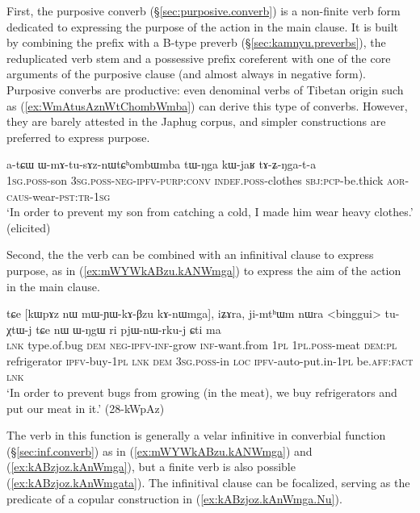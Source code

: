 First, the purposive converb (§\ref{sec:purposive.converb}) is a non-finite verb form dedicated to expressing the purpose of the action in the main clause. It is built by combining the prefix  with a B-type preverb (§\ref{sec:kamnyu.preverbs}), the reduplicated verb stem and a possessive prefix coreferent with one of the core arguments of the purposive clause (and almost always in negative form). Purposive converbs are productive: even denominal verbs of Tibetan origin such as    (\ref{ex:WmAtusAznWtChombWmba}) can derive this type of converbs. However, they are barely attested in the Japhug corpus, and simpler constructions are preferred to express purpose.


\begin{exe}
\ex \label{ex:WmAtusAznWtChombWmba}
\gll  a-tɕɯ ɯ-mɤ-tu-sɤz-nɯtɕʰombɯ\redp{}mba tɯ-ŋga kɯ-jaʁ tɤ-ʑ-ŋga-t-a \\
\textsc{1sg}.\textsc{poss}-son \textsc{3sg}.\textsc{poss}-\textsc{neg}-\textsc{ipfv}-\textsc{purp}:\textsc{conv} \textsc{indef}.\textsc{poss}-clothes \textsc{sbj}:\textsc{pcp}-be.thick \textsc{aor}-\textsc{caus}-wear-\textsc{pst}:\textsc{tr}-\textsc{1sg} \\
\glt `In order to prevent my son from catching a cold, I made him wear heavy clothes.' (elicited)
\end{exe}

Second, the  the verb   can be combined with an infinitival clause to express purpose, as in (\ref{ex:mWYWkABzu.kANWmga}) to express the aim of the action in the main clause. 


\begin{exe}
\ex \label{ex:mWYWkABzu.kANWmga}
\gll tɕe [kɯpɤz nɯ mɯ-ɲɯ-kɤ-βzu kɤ-nɯmga], iʑɤra, ji-mtʰɯm nɯra <binggui> tu-χtɯ-j tɕe nɯ ɯ-ŋgɯ ri pjɯ-nɯ-rku-j ɕti ma \\
\textsc{lnk} type.of.bug \textsc{dem} \textsc{neg}-\textsc{ipfv}-\textsc{inf}-grow \textsc{inf}-want.from \textsc{1pl} \textsc{1pl}.\textsc{poss}-meat \textsc{dem}:\textsc{pl} refrigerator  \textsc{ipfv}-buy-\textsc{1pl} \textsc{lnk} \textsc{dem} \textsc{3sg}.\textsc{poss}-in \textsc{loc} \textsc{ipfv}-auto-put.in-\textsc{1pl} be.\textsc{aff}:\textsc{fact} \textsc{lnk} \\
\glt `In order to prevent  bugs from growing (in the meat), we buy refrigerators and put our meat in it.' (28-kWpAz)
\end{exe}

The verb  in this function is generally a velar infinitive   in converbial function (§\ref{sec:inf.converb}) as in (\ref{ex:mWYWkABzu.kANWmga}) and (\ref{ex:kABzjoz.kAnWmga}), but a finite verb is also possible (\ref{ex:kABzjoz.kAnWmgata}). The infinitival clause can be focalized, serving as the predicate of a copular construction in  (\ref{ex:kABzjoz.kAnWmga.Nu}).

